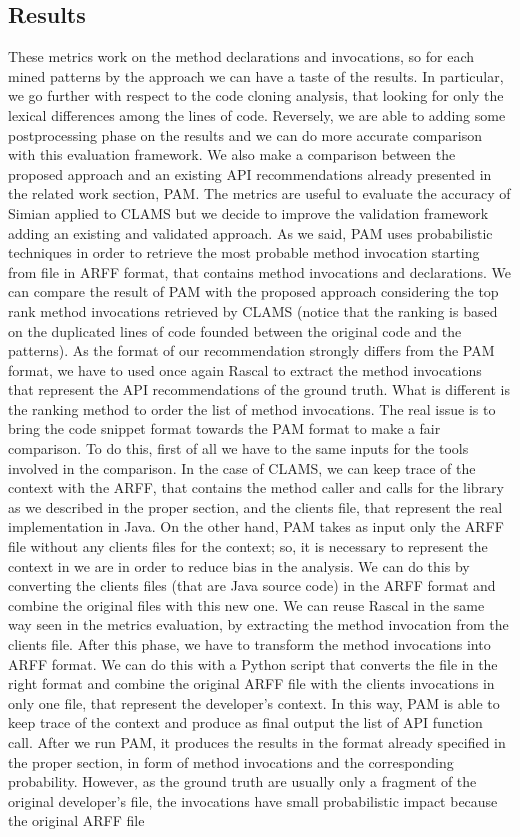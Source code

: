 \subsection{Results}

These metrics work on the method declarations and invocations, so for each mined patterns by the approach we can have a taste of the results. In particular, we go further with respect to the code cloning analysis, that looking for only the lexical differences among the lines of code. Reversely, we are able to adding some postprocessing phase on the results and we can do more accurate comparison with this evaluation framework. 
 We also make a comparison between the proposed approach and an existing API recommendations already presented in the related work section, PAM. The metrics are useful to evaluate the accuracy of Simian applied to CLAMS but we decide to improve the validation framework adding an existing and validated approach. As we said, PAM uses probabilistic techniques in order to retrieve the most probable method invocation starting from file in ARFF format, that contains method invocations and declarations. We can compare the result of PAM with the proposed approach considering the top rank method invocations retrieved by CLAMS (notice that the ranking is based on the duplicated lines of code founded between the original code and the patterns). As the format of our recommendation strongly differs from the PAM format, we have to used once again Rascal to extract the method invocations that represent the API recommendations of the ground truth. What is different is the ranking method to order the list of method invocations. The real issue is to bring the code snippet format towards the PAM format to make a fair comparison. To do this, first of all we have to the same inputs for the tools involved in the comparison. In the case of CLAMS, we can keep trace of the context with the ARFF, that contains the method caller and calls for the library as we described in the proper section, and the clients file, that represent the real implementation in Java. On the other hand, PAM takes as input only the ARFF file without any clients files for the context; so, it is necessary to represent the context in we are in order to reduce bias in the analysis. We can do this by converting the clients files (that are Java source code) in the ARFF format and combine the original files with this new one. We can reuse Rascal in the same way seen in the metrics evaluation, by extracting the method invocation from the clients file. After this phase, we have to transform the method invocations into ARFF format. We can do this with a Python script that converts the file in the right format and combine the original ARFF file with the clients invocations in only one file, that represent the developer's context. In this way, PAM is able to keep trace of the context and produce as final output the list of API function call. After we run PAM, it produces the results in the format already specified in the proper section, in form of method invocations and the corresponding probability. However, as the ground truth are usually only a fragment of the original developer's file, the invocations have small probabilistic impact because the original ARFF file 